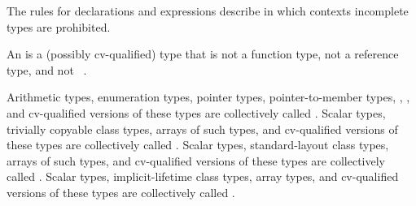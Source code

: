 \pnum
\begin{note}
The rules for declarations and expressions describe in which
contexts incomplete types are prohibited.
\end{note}

\pnum
\label{term.object.type}%
An  is a (possibly cv-qualified) type that is not
a function type, not a reference type, and not \cv{}~.

\pnum
{}%
%
%
\label{term.scalar.type}%
Arithmetic types, enumeration types,
pointer types, pointer-to-member types,
, ,
and
cv-qualified versions of these
types are collectively called
.
\label{term.trivially.copyable.type}%
Scalar types, trivially copyable class types,
arrays of such types, and cv-qualified versions of these
types are collectively called .
\label{term.standard.layout.type}%
Scalar types, standard-layout class
types, arrays of such types, and
cv-qualified versions of these types
are collectively called .
\label{term.implicit.lifetime.type}%
Scalar types, implicit-lifetime class types,
array types, and cv-qualified versions of these types
are collectively called .

